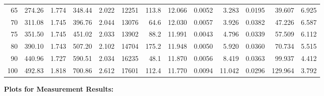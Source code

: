 \documentclass[10pt]{article}
\begin{document}
{\begin{tabular}{|r|rr|rr|rr|rr|rr|r|r|}
       65 &       274.26 &        1.774 &       348.44 &        2.022 &        12251 &        113.8 &       12.066 &       0.0052 &        3.283 &       0.0195 &       39.607 &        6.925 \\
       70 &       311.08 &        1.745 &       396.76 &        2.044 &        13076 &         64.6 &       12.030 &       0.0057 &        3.926 &       0.0382 &       47.226 &        6.587 \\
       75 &       351.50 &        1.745 &       451.02 &        2.033 &        13902 &         88.2 &       11.991 &       0.0043 &        4.796 &       0.0339 &       57.509 &        6.112 \\
       80 &       390.10 &        1.743 &       507.20 &        2.102 &        14704 &        175.2 &       11.948 &       0.0050 &        5.920 &       0.0360 &       70.734 &        5.515 \\
       90 &       440.96 &        1.727 &       590.51 &        2.034 &        16235 &         48.1 &       11.870 &       0.0056 &        8.419 &       0.0363 &       99.937 &        4.412 \\
      100 &       492.83 &        1.818 &       700.86 &        2.612 &        17601 &        112.4 &       11.770 &       0.0094 &       11.042 &       0.0296 &      129.964 &        3.792 \\
\hline
\end{tabular}
}

\vspace{3mm}






\pagebreak
\noindent
{\large \bf Plots for Measurement Results:}
\vspace{5mm}
\end{document}
